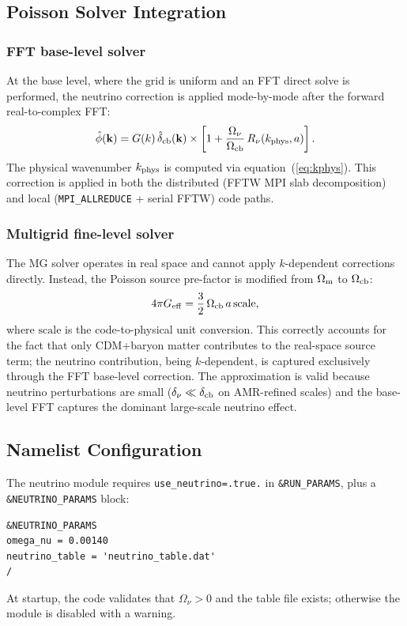 \documentclass[fleqn,usenatbib]{mnras}
\newcommand{\code}[1]{\texttt{#1}}
\newcommand{\Onu}{\Omega_\nu}
\newcommand{\Ocb}{\Omega_{\rm cb}}
\newcommand{\Om}{\Omega_{\rm m}}
\newcommand{\Rnu}{R_\nu}
\begin{document}
\subsection{Poisson Solver Integration}
\label{sec:nu_poisson}

\subsubsection{FFT base-level solver}

At the base level, where the grid is uniform and an FFT direct solve
is performed, the neutrino correction is applied mode-by-mode after
the forward real-to-complex FFT:
\begin{equation}
\hat{\phi}(\mathbf{k}) = G(k)\,\hat{\delta}_{\rm cb}(\mathbf{k})
  \times \left[1 + \frac{\Onu}{\Ocb}\,\Rnu(k_{\rm phys},a)\right].
\label{eq:nu_fft}
\end{equation}
The physical wavenumber $k_{\rm phys}$ is computed via
equation~(\ref{eq:kphys}).  This correction is applied in both the
distributed (FFTW MPI slab decomposition) and local
(\code{MPI\_ALLREDUCE} + serial FFTW) code paths.

\subsubsection{Multigrid fine-level solver}

The MG solver operates in real space and cannot apply $k$-dependent
corrections directly.  Instead, the Poisson source pre-factor is
modified from $\Om$ to $\Ocb$:
\begin{equation}
4\pi G_{\rm eff} = \frac{3}{2}\,\Ocb\,a\,\mathrm{scale},
\label{eq:fourpi_nu}
\end{equation}
where $\mathrm{scale}$ is the code-to-physical unit conversion.  This
correctly accounts for the fact that only CDM+baryon matter contributes
to the real-space source term; the neutrino contribution, being
$k$-dependent, is captured exclusively through the FFT base-level
correction.  The approximation is valid because neutrino perturbations
are small ($\delta_\nu \ll \delta_{\rm cb}$ on AMR-refined scales) and
the base-level FFT captures the dominant large-scale neutrino effect.

\subsection{Namelist Configuration}

The neutrino module requires \code{use\_neutrino=.true.} in
\code{\&RUN\_PARAMS}, plus a \code{\&NEUTRINO\_PARAMS} block:
\begin{verbatim}
&NEUTRINO_PARAMS
omega_nu = 0.00140
neutrino_table = 'neutrino_table.dat'
/
\end{verbatim}
At startup, the code validates that $\Onu > 0$ and the table file
exists; otherwise the module is disabled with a warning.
\end{document}
